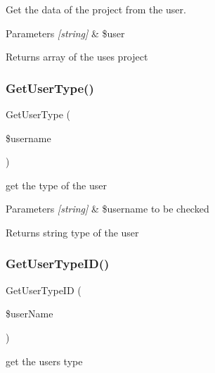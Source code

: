 Get the data of the project from the user. 


\begin{DoxyParams}{Parameters}
{\em \mbox{[}string\mbox{]}} & \$user\\
\hline
\end{DoxyParams}
\begin{DoxyReturn}{Returns}
array of the use\textquotesingle{}s project 
\end{DoxyReturn}
\mbox{\label{class_user_d_a_o_ad14a0bb9938aa18999d1e9b655bb28b1}} 
\subsubsection{\texorpdfstring{Get\+User\+Type()}{GetUserType()}}
{\footnotesize\ttfamily Get\+User\+Type (\begin{DoxyParamCaption}\item[{}]{\$username }\end{DoxyParamCaption})}



get the type of the user 


\begin{DoxyParams}{Parameters}
{\em \mbox{[}string\mbox{]}} & \$username to be checked\\
\hline
\end{DoxyParams}
\begin{DoxyReturn}{Returns}
string type of the user 
\end{DoxyReturn}
\mbox{\label{class_user_d_a_o_a5c049c930f6e2a9933d752976bb721dc}} 
\subsubsection{\texorpdfstring{Get\+User\+Type\+I\+D()}{GetUserTypeID()}}
{\footnotesize\ttfamily Get\+User\+Type\+ID (\begin{DoxyParamCaption}\item[{}]{\$user\+Name }\end{DoxyParamCaption})}



get the user\textquotesingle{}s type 


